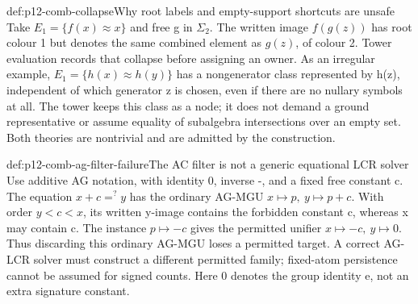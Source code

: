 \begin{hbexample}{def:p12-comb-collapse}{Why root labels and empty-support shortcuts are unsafe}
Take \(E_1=\{f(x)\approx x\}\) and free g in \(\Sigma_2\).
The written image \(f(g(z))\) has root colour 1 but denotes the same
combined element as \(g(z)\), of colour 2. Tower evaluation records that
collapse before assigning an owner. As an irregular example,
\(E_1=\{h(x)\approx h(y)\}\) has a nongenerator class represented
by h(z), independent of which generator z is chosen, even if there
are no nullary symbols at all. The tower keeps this class as a node;
it does not demand a ground representative or assume equality of
subalgebra intersections over an empty set. Both theories are
nontrivial and are admitted by the construction.
\end{hbexample}

\begin{hbexample}{def:p12-comb-ag-filter-failure}{The AC filter is not a generic equational LCR solver}
Use additive AG notation, with identity 0, inverse -, and a fixed free
constant c. The equation \(x+c=^{?}y\) has the ordinary AG-MGU
\(x\mapsto p,\ y\mapsto p+c\). With order \(y<c<x\), its written
y-image contains the forbidden constant c, whereas x may contain c.
The instance \(p\mapsto -c\) gives the permitted unifier
\(x\mapsto -c,\ y\mapsto0\). Thus discarding this ordinary AG-MGU loses a permitted
target. A correct AG-LCR solver must construct a different permitted
family; fixed-atom persistence cannot be assumed for signed counts.
Here 0 denotes the group identity e, not an extra signature constant.
\end{hbexample}

